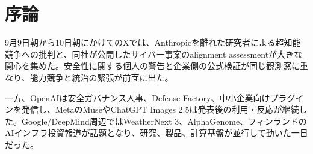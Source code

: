 \section{序論}
9月9日朝から10日朝にかけてのXでは、Anthropicを離れた研究者による超知能競争への批判と、同社が公開したサイバー事案のalignment assessmentが大きな関心を集めた。安全性に関する個人の警告と企業側の公式検証が同じ観測窓に重なり、能力競争と統治の緊張が前面に出た。

一方、OpenAIは安全ガバナンス人事、Defense Factory、中小企業向けプラグインを発信し、MetaのMuseやChatGPT Images 2.5は発表後の利用・反応が継続した。Google/DeepMind周辺ではWeatherNext 3、AlphaGenome、フィンランドのAIインフラ投資報道が話題となり、研究、製品、計算基盤が並行して動いた一日だった。
